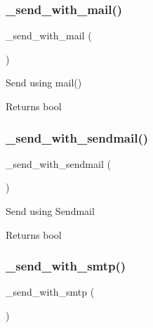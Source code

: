 \subsubsection{\texorpdfstring{\+\_\+send\+\_\+with\+\_\+mail()}{\_send\_with\_mail()}}
{\footnotesize\ttfamily \+\_\+send\+\_\+with\+\_\+mail (\begin{DoxyParamCaption}{ }\end{DoxyParamCaption})\hspace{0.3cm}{\ttfamily [protected]}}

Send using mail()

\begin{DoxyReturn}{Returns}
bool 
\end{DoxyReturn}
\mbox{\label{class_c_i___email_a22ce9dc271da86e2a25041aa70e02502}} 
\subsubsection{\texorpdfstring{\+\_\+send\+\_\+with\+\_\+sendmail()}{\_send\_with\_sendmail()}}
{\footnotesize\ttfamily \+\_\+send\+\_\+with\+\_\+sendmail (\begin{DoxyParamCaption}{ }\end{DoxyParamCaption})\hspace{0.3cm}{\ttfamily [protected]}}

Send using Sendmail

\begin{DoxyReturn}{Returns}
bool 
\end{DoxyReturn}
\mbox{\label{class_c_i___email_a691e57a39f6f8956c5054fd7b109bb12}} 
\subsubsection{\texorpdfstring{\+\_\+send\+\_\+with\+\_\+smtp()}{\_send\_with\_smtp()}}
{\footnotesize\ttfamily \+\_\+send\+\_\+with\+\_\+smtp (\begin{DoxyParamCaption}{ }\end{DoxyParamCaption})\hspace{0.3cm}{\ttfamily [protected]}}

